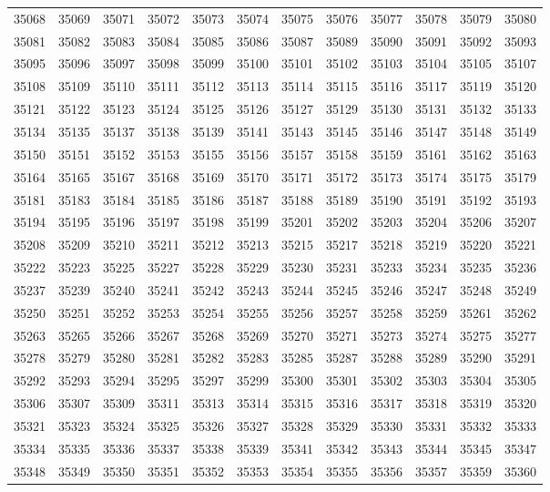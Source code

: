 \begin{center}
\begin{longtable}{llllllllllll}
35068 &35069 &35071 &35072 &35073 &35074 &35075 &35076 &35077 &35078 &35079 &35080 \\
35081 &35082 &35083 &35084 &35085 &35086 &35087 &35089 &35090 &35091 &35092 &35093 \\
35095 &35096 &35097 &35098 &35099 &35100 &35101 &35102 &35103 &35104 &35105 &35107 \\
35108 &35109 &35110 &35111 &35112 &35113 &35114 &35115 &35116 &35117 &35119 &35120 \\
35121 &35122 &35123 &35124 &35125 &35126 &35127 &35129 &35130 &35131 &35132 &35133 \\
35134 &35135 &35137 &35138 &35139 &35141 &35143 &35145 &35146 &35147 &35148 &35149 \\
35150 &35151 &35152 &35153 &35155 &35156 &35157 &35158 &35159 &35161 &35162 &35163 \\
35164 &35165 &35167 &35168 &35169 &35170 &35171 &35172 &35173 &35174 &35175 &35179 \\
35181 &35183 &35184 &35185 &35186 &35187 &35188 &35189 &35190 &35191 &35192 &35193 \\
35194 &35195 &35196 &35197 &35198 &35199 &35201 &35202 &35203 &35204 &35206 &35207 \\
35208 &35209 &35210 &35211 &35212 &35213 &35215 &35217 &35218 &35219 &35220 &35221 \\
35222 &35223 &35225 &35227 &35228 &35229 &35230 &35231 &35233 &35234 &35235 &35236 \\
35237 &35239 &35240 &35241 &35242 &35243 &35244 &35245 &35246 &35247 &35248 &35249 \\
35250 &35251 &35252 &35253 &35254 &35255 &35256 &35257 &35258 &35259 &35261 &35262 \\
35263 &35265 &35266 &35267 &35268 &35269 &35270 &35271 &35273 &35274 &35275 &35277 \\
35278 &35279 &35280 &35281 &35282 &35283 &35285 &35287 &35288 &35289 &35290 &35291 \\
35292 &35293 &35294 &35295 &35297 &35299 &35300 &35301 &35302 &35303 &35304 &35305 \\
35306 &35307 &35309 &35311 &35313 &35314 &35315 &35316 &35317 &35318 &35319 &35320 \\
35321 &35323 &35324 &35325 &35326 &35327 &35328 &35329 &35330 &35331 &35332 &35333 \\
35334 &35335 &35336 &35337 &35338 &35339 &35341 &35342 &35343 &35344 &35345 &35347 \\
35348 &35349 &35350 &35351 &35352 &35353 &35354 &35355 &35356 &35357 &35359 &35360 \\

\end{longtable}
\end{center}
